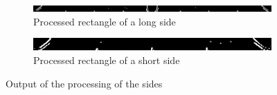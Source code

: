 \begin{figure}
    \centering
    \begin{subfigure}[b]{\textwidth}
    \includegraphics[width=\textwidth]{./imgs/sobel_long_side.png}
    \caption{Processed rectangle of a long side}\par
    \end{subfigure}\vspace{10pt}
    \begin{subfigure}[b]{\textwidth}
    \includegraphics[width=\textwidth]{./imgs/sobel_short_side.png}
    \caption{Processed rectangle of a short side}
    \end{subfigure}
    \caption{Output of the processing of the sides}
    \label{fig:sidestabol}
\end{figure}

\vspace{20pt}

